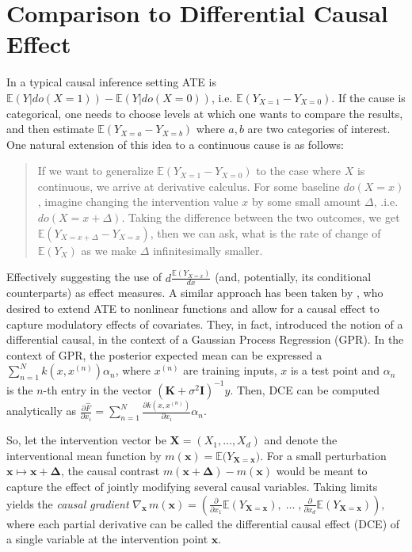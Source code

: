 \documentclass[anon,12pt]{clear2026} %
\begin{document}
\section{Comparison to Differential Causal Effect}\label{app:DCE}

In a typical causal inference setting ATE is $\mathbb{E}(Y\vert do(X=1)) - \mathbb{E}(Y\vert do(X=0))$, i.e. $\mathbb{E}(Y_{X=1} - Y_{X=0})$. If the cause is categorical, one needs to choose levels at which one wants to compare the results, and then estimate  $\mathbb{E}(Y_{X=a} - Y_{X=b})$ where $a, b$ are two categories of interest. One natural extension of this idea to a continuous cause is as follows:


\begin{quote}If we want to generalize  $\mathbb{E}(Y_{X=1} - Y_{X=0})$ to the case where $X$ is continuous, we arrive at derivative calculus. For some baseline $do(X=x)$, imagine changing the intervention value $x$ by some small amount $\Delta$, .i.e. $do(X=x+\Delta)$. Taking the difference between the two outcomes, we get  $\mathbb{E}(Y_{X=x+\Delta} - Y_{X=x})$, then we can ask, what is the rate of change of $\mathbb{E}(Y_{X})$ as we make $\Delta$ infinitesimally smaller. \cite[section 7.4.3.]{ness2025causal}\end{quote}

Effectively suggesting the use of $d\frac{\mathbb{E}(Y_{X=x})}{dx}$ (and, potentially, its conditional counterparts) as effect measures. A similar approach has been taken by \cite{butler2022differential}, who desired to extend ATE to nonlinear functions and allow for a causal effect to capture modulatory effects of covariates. They, in fact, introduced the notion of a differential causal, in the context of a Gaussian Process Regression (GPR). In the context of GPR, the posterior expected mean can be expressed a $ \sum_{n=1}^N k(x, x^{(n)}) \alpha_n $, where $x^{(n)}$ are training inputs, $x$ is a test point and $\alpha_n$ is the $n$-th entry in the vector $(\mathbf{K} + \sigma^2 \mathbf{I})^{-1}y$. Then, DCE can be computed analytically as $\frac{\partial \hat{F}}{\partial x_i} = \sum_{n=1}^{N} \frac{\partial k (x, x^{(n)})}{\partial x_i}\alpha_n$.

So, let the intervention vector be
$\mathbf{X} = (X_1,\ldots,X_d)$ and denote the interventional mean function by
$
m(\mathbf{x}) = \mathbb{E}\bigl(Y_{\mathbf{X}=\mathbf{x}}\bigr).
$ For a small perturbation $\mathbf{x} \mapsto \mathbf{x} + \boldsymbol{\Delta}$,
the causal contrast
$
m(\mathbf{x} + \boldsymbol{\Delta}) - m(\mathbf{x})
$
would be meant to capture the effect of jointly modifying several causal variables. Taking limits yields the \emph{causal gradient}
$ \nabla_{\mathbf{x}}\, m(\mathbf{x})
= \left(
\frac{\partial}{\partial x_1}\mathbb{E}(Y_{\mathbf{X}=\mathbf{x}}),
\;\ldots\;,
\frac{\partial}{\partial x_d}\mathbb{E}(Y_{\mathbf{X}=\mathbf{x}})
\right), $
where each partial derivative can be called the differential causal effect (DCE) of a single variable at the
intervention point $\mathbf{x}$.
\end{document}
